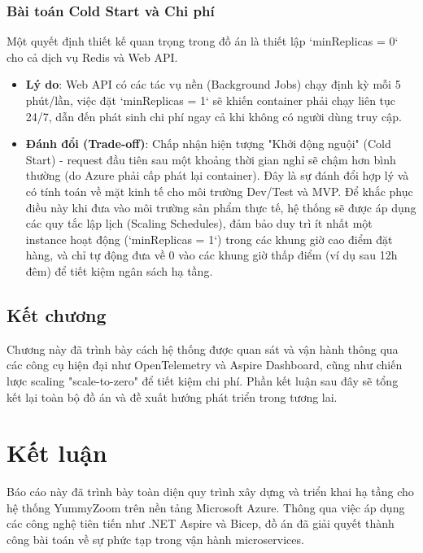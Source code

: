 \documentclass[a4paper,12pt,twoside]{report}
\begin{document}
\subsection{Bài toán Cold Start và Chi phí}
Một quyết định thiết kế quan trọng trong đồ án là thiết lập `minReplicas = 0` cho cả dịch vụ Redis và Web API.
\begin{itemize}
    \item \textbf{Lý do}: Web API có các tác vụ nền (Background Jobs) chạy định kỳ mỗi 5 phút/lần, việc đặt `minReplicas = 1` sẽ khiến container phải chạy liên tục 24/7, dẫn đến phát sinh chi phí ngay cả khi không có người dùng truy cập.
    \item \textbf{Đánh đổi (Trade-off)}: Chấp nhận hiện tượng "Khởi động nguội" (Cold Start) - request đầu tiên sau một khoảng thời gian nghỉ sẽ chậm hơn bình thường (do Azure phải cấp phát lại container). Đây là sự đánh đổi hợp lý và có tính toán về mặt kinh tế cho môi trường Dev/Test và MVP. Để khắc phục điều này khi đưa vào môi trường sản phẩm thực tế, hệ thống sẽ được áp dụng các quy tắc lập lịch (Scaling Schedules), đảm bảo duy trì ít nhất một instance hoạt động (`minReplicas = 1`) trong các khung giờ cao điểm đặt hàng, và chỉ tự động đưa về 0 vào các khung giờ thấp điểm (ví dụ sau 12h đêm) để tiết kiệm ngân sách hạ tầng.
\end{itemize}

\section*{Kết chương}

Chương này đã trình bày cách hệ thống được quan sát và vận hành thông qua các công cụ hiện đại như OpenTelemetry và Aspire Dashboard, cũng như chiến lược scaling "scale-to-zero" để tiết kiệm chi phí. Phần kết luận sau đây sẽ tổng kết lại toàn bộ đồ án và đề xuất hướng phát triển trong tương lai.


\chapter*{Kết luận}

Báo cáo này đã trình bày toàn diện quy trình xây dựng và triển khai hạ tầng cho hệ thống YummyZoom trên nền tảng Microsoft Azure. Thông qua việc áp dụng các công nghệ tiên tiến như .NET Aspire và Bicep, đồ án đã giải quyết thành công bài toán về sự phức tạp trong vận hành microservices.
\end{document}
